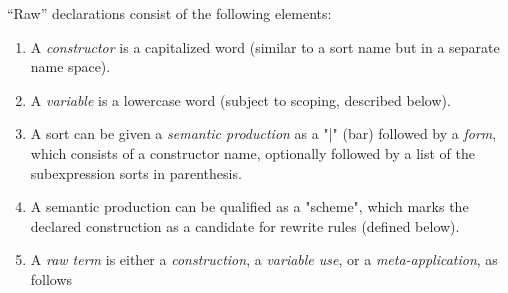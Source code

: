 \documentclass[11pt]{article} %
\begin{document}
\begin{manual}\label{man:raw}
  ``Raw'' declarations consist of the following elements:
  \begin{enumerate}

  \item A \emph{constructor} is a capitalized word (similar to a sort name but in a separate name
    space).

  \item A \emph{variable} is a lowercase word (subject to scoping, described below).

  \item A sort can be given a \emph{semantic production} as a "|" (bar) followed by a \emph{form},
    which consists of a constructor name, optionally followed by a list of the subexpression sorts
    in parenthesis.


  \item A semantic production can be qualified as a "scheme", which marks the declared construction
    as a candidate for rewrite rules (defined below).

  \item A \emph{raw term} is either a \emph{construction}, a \emph{variable use}, or a
    \emph{meta-application}, as follows
    \begin{enumerate}


\end{enumerate}
\end{enumerate}
\end{manual}
\end{document}
